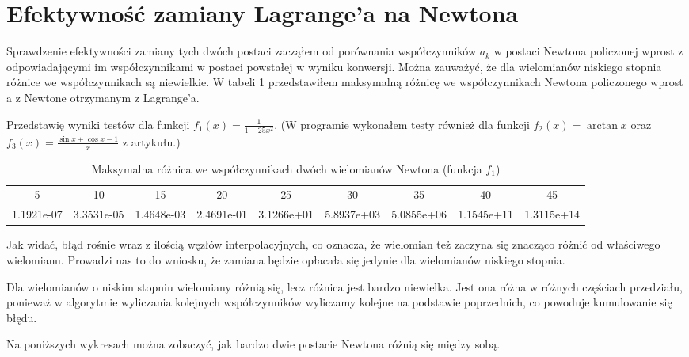 \documentclass[a4paper]{article}
\begin{document}
\section{Efektywność zamiany Lagrange'a na Newtona}
Sprawdzenie efektywności zamiany tych dwóch postaci zacząłem od porównania współczynników $a_k$ w
postaci Newtona policzonej wprost z odpowiadającymi im współczynnikami w postaci powstałej w wyniku
konwersji. Można zauważyć, że dla wielomianów niskiego stopnia różnice we współczynnikach są 
niewielkie. W tabeli 1 przedstawiłem maksymalną różnicę we współczynnikach Newtona policzonego wprost
a z Newtone otrzymanym z Lagrange'a.

Przedstawię wyniki testów dla funkcji $f_1(x) = \frac{1}{1+25x^2}$. (W programie wykonałem testy
również dla funkcji $f_2(x) = \arctan{x}$ oraz $f_3(x) = \frac{\sin{x} + \cos{x} - 1}{x}$ z artykułu.)

\color{red}
\begin{table}[!h]
  \centering
\begin{tabular}{|c||c||c||c||c||c||c||c||c|}
  \hline
     5     &    10      &    15      &    20      &    25      &    30      &    35      &    40      &    45      \\
1.1921e-07 & 3.3531e-05 & 1.4648e-03 & 2.4691e-01 & 3.1266e+01 & 5.8937e+03 & 5.0855e+06 & 1.1545e+11 & 1.3115e+14 \\
  \hline 
\end{tabular}
\caption{Maksymalna różnica we współczynnikach dwóch wielomianów Newtona (funkcja $f_1$)}
\end{table}
\color{black}

Jak widać, błąd rośnie wraz z ilością węzłów interpolacyjnych, co oznacza, że wielomian też zaczyna
się znacząco różnić od właściwego wielomianu. Prowadzi nas to do wniosku, że zamiana będzie 
opłacała się jedynie dla wielomianów niskiego stopnia.

Dla wielomianów o niskim stopniu wielomiany różnią się, lecz różnica jest bardzo niewielka. Jest ona 
różna w różnych częściach przedziału, ponieważ w algorytmie wyliczania kolejnych współczynników 
wyliczamy kolejne na podstawie poprzednich, co powoduje kumulowanie się błędu.

Na poniższych wykresach można zobaczyć, jak bardzo dwie postacie Newtona różnią się między sobą.
\end{document}

